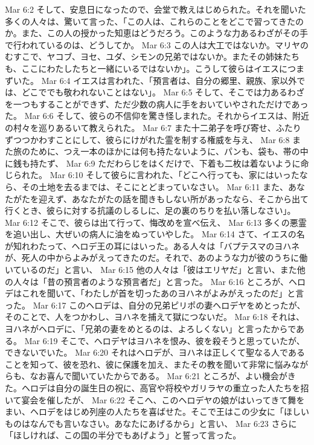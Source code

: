 Mar 6:2  そして、安息日になったので、会堂で教えはじめられた。それを聞いた多くの人々は、驚いて言った、「この人は、これらのことをどこで習ってきたのか。また、この人の授かった知恵はどうだろう。このような力あるわざがその手で行われているのは、どうしてか。
Mar 6:3  この人は大工ではないか。マリヤのむすこで、ヤコブ、ヨセ、ユダ、シモンの兄弟ではないか。またその姉妹たちも、ここにわたしたちと一緒にいるではないか」。こうして彼らはイエスにつまずいた。
Mar 6:4  イエスは言われた、「預言者は、自分の郷里、親族、家以外では、どこででも敬われないことはない」。
Mar 6:5  そして、そこでは力あるわざを一つもすることができず、ただ少数の病人に手をおいていやされただけであった。
Mar 6:6  そして、彼らの不信仰を驚き怪しまれた。それからイエスは、附近の村々を巡りあるいて教えられた。
Mar 6:7  また十二弟子を呼び寄せ、ふたりずつつかわすことにして、彼らにけがれた霊を制する権威を与え、
Mar 6:8  また旅のために、つえ一本のほかには何も持たないように、パンも、袋も、帯の中に銭も持たず、
Mar 6:9  ただわらじをはくだけで、下着も二枚は着ないように命じられた。
Mar 6:10  そして彼らに言われた、「どこへ行っても、家にはいったなら、その土地を去るまでは、そこにとどまっていなさい。
Mar 6:11  また、あなたがたを迎えず、あなたがたの話を聞きもしない所があったなら、そこから出て行くとき、彼らに対する抗議のしるしに、足の裏のちりを払い落しなさい」。
Mar 6:12  そこで、彼らは出て行って、悔改めを宣べ伝え、
Mar 6:13  多くの悪霊を追い出し、大ぜいの病人に油をぬっていやした。
Mar 6:14  さて、イエスの名が知れわたって、ヘロデ王の耳にはいった。ある人々は「バプテスマのヨハネが、死人の中からよみがえってきたのだ。それで、あのような力が彼のうちに働いているのだ」と言い、
Mar 6:15  他の人々は「彼はエリヤだ」と言い、また他の人々は「昔の預言者のような預言者だ」と言った。
Mar 6:16  ところが、ヘロデはこれを聞いて、「わたしが首を切ったあのヨハネがよみがえったのだ」と言った。
Mar 6:17  このヘロデは、自分の兄弟ピリポの妻ヘロデヤをめとったが、そのことで、人をつかわし、ヨハネを捕えて獄につないだ。
Mar 6:18  それは、ヨハネがヘロデに、「兄弟の妻をめとるのは、よろしくない」と言ったからである。
Mar 6:19  そこで、ヘロデヤはヨハネを恨み、彼を殺そうと思っていたが、できないでいた。
Mar 6:20  それはヘロデが、ヨハネは正しくて聖なる人であることを知って、彼を恐れ、彼に保護を加え、またその教を聞いて非常に悩みながらも、なお喜んで聞いていたからである。
Mar 6:21  ところが、よい機会がきた。ヘロデは自分の誕生日の祝に、高官や将校やガリラヤの重立った人たちを招いて宴会を催したが、
Mar 6:22  そこへ、このヘロデヤの娘がはいってきて舞をまい、ヘロデをはじめ列座の人たちを喜ばせた。そこで王はこの少女に「ほしいものはなんでも言いなさい。あなたにあげるから」と言い、
Mar 6:23  さらに「ほしければ、この国の半分でもあげよう」と誓って言った。
